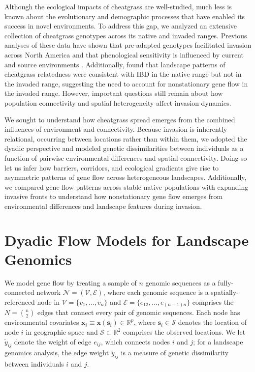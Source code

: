 \documentclass{article}
\begin{document}
Although the ecological impacts of cheatgrass are well-studied, much less is known about the evolutionary and demographic processes that have enabled its success in novel environments. To address this gap, we analyzed an extensive collection of cheatgrass genotypes across its native and invaded ranges. 
Previous analyses of these data have shown that pre-adapted genotypes facilitated invasion across North America \citep{gamba2025local} and that phenological sensitivity is influenced by current and source environments \citep{vahsen2025phenological}. Additionally, \cite{gamba2025local} found that landscape patterns of cheatgrass relatedness were consistent with IBD in the native range but not in the invaded range, suggesting the need to account for nonstationary gene flow in the invaded range.
However, important questions still remain about how population connectivity and spatial heterogeneity affect invasion dynamics.

We sought to understand how cheatgrass spread emerges from the combined influences of environment and connectivity. 
Because invasion is inherently relational, occurring between locations rather than within them, we adopted the dyadic perspective and modeled genetic dissimilarities between individuals as a function of pairwise environmental differences and spatial connectivity. Doing so let us infer how barriers, corridors, and ecological gradients give rise to asymmetric patterns of gene flow across heterogeneous landscapes. Additionally, we compared gene flow patterns across stable native populations with expanding invasive fronts to understand how nonstationary gene flow emerges from environmental differences and landscape features during invasion. 

\section{Dyadic Flow Models for Landscape Genomics}
\label{sec:dyadic-models}

We model gene flow by treating a sample of $n$ genomic sequences as a fully-connected network $\mathcal{N}=(\mathcal{V},\mathcal{E})$, where each genomic sequence is a spatially-referenced node in $\mathcal{V}=\{v_1,...,v_n\}$ and $\mathcal{E}=\{e_{12},...,e_{(n-1)n}\}$ comprises the $N={n \choose 2}$ edges that connect every pair of genomic sequences.
Each node has environmental covariates $\mathbf{x}_i\equiv\mathbf{x}(\mathbf{s}_i)\in\mathbb{R}^p$, where $\mathbf{s}_i\in\mathcal{S}$ denotes the location of node $i$ in geographic space and $\mathcal{S}\subset\mathbb{R}^2$ comprises the observed locations.
We let $\widetilde{y}_{ij}$ denote the weight of edge $e_{ij}$, which connects nodes $i$ and $j$; for a landscape genomics analysis, the edge weight $\widetilde{y}_{ij}$ is a measure of genetic dissimilarity between individuals $i$ and $j$.
\end{document}

